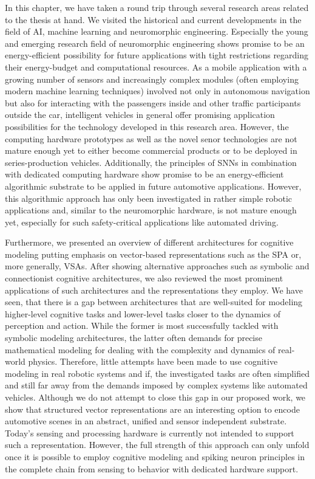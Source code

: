 In this chapter, we have taken a round trip through several research areas related to the thesis at hand.
We visited the historical and current developments in the field of \ac{AI}, machine learning and neuromorphic engineering.
Especially the young and emerging research field of neuromorphic engineering shows promise to be an energy-efficient possibility for future applications with tight restrictions regarding their energy-budget and computational resources.
As a mobile application with a growing number of sensors and increasingly complex modules (often employing modern machine learning techniques) involved not only in autonomous navigation but also for interacting with the passengers inside and other traffic participants outside the car, intelligent vehicles in general offer promising application possibilities for the technology developed in this research area.
However, the computing hardware prototypes \parencite{Furber2014, Akopyan2015, Davies2018} as well as the novel senor technologies \parencite{Lichtsteiner2008} are not mature enough yet to either become commercial products or to be deployed in series-production vehicles.
Additionally, the principles of \acp{SNN} in combination with dedicated computing hardware show promise to be an energy-efficient algorithmic substrate to be applied in future automotive applications.
However, this algorithmic approach has only been investigated in rather simple robotic applications \parencite{Conradt2014, Stewart2016, Galluppi2014} and, similar to the neuromorphic hardware, is not mature enough yet, especially for such safety-critical applications like automated driving.

Furthermore, we presented an overview of different architectures for cognitive modeling putting emphasis on vector-based representations such as the \ac{SPA} or, more generally, \acp{VSA}.
After showing alternative approaches such as symbolic and connectionist cognitive architectures, we also reviewed the most prominent applications of such architectures and the representations they employ.
We have seen, that there is a gap between architectures that are well-suited for modeling higher-level cognitive tasks and lower-level tasks closer to the dynamics of perception and action.
While the former is most successfully tackled with symbolic modeling architectures, the latter often demands for precise mathematical modeling for dealing with the complexity and dynamics of real-world physics.
Therefore, little attempts have been made to use cognitive modeling in real robotic systems and if, the investigated tasks are often simplified \parencite{Neubert2016} and still far away from the demands imposed by complex systems like automated vehicles.
Although we do not attempt to close this gap in our proposed work, we show that structured vector representations are an interesting option to encode automotive scenes in an abstract, unified and sensor independent substrate.
Today's sensing and processing hardware is currently not intended to support such a representation.
However, the full strength of this approach can only unfold once it is possible to employ cognitive modeling and spiking neuron principles in the complete chain from sensing to behavior with dedicated hardware support.

